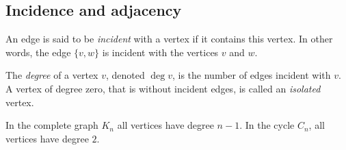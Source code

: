 

\setcounter{section}{1}
\setcounter{subsection}{4}
\setcounter{dfn}{8}

\subsection{Incidence and adjacency}
An edge is said to be \emph{incident} with a vertex if it contains this vertex.
In other words, the edge $\{v, w\}$ is incident with the vertices $v$ and $w$.

The \emph{degree} of a vertex $v$, denoted $\deg v$, is the number of edges incident with $v$.
A vertex of degree zero, that is without incident edges, is called an \emph{isolated} vertex.

In the complete graph $K_n$ all vertices have degree $n-1$.
In the cycle $C_n$, all vertices have degree $2$.


